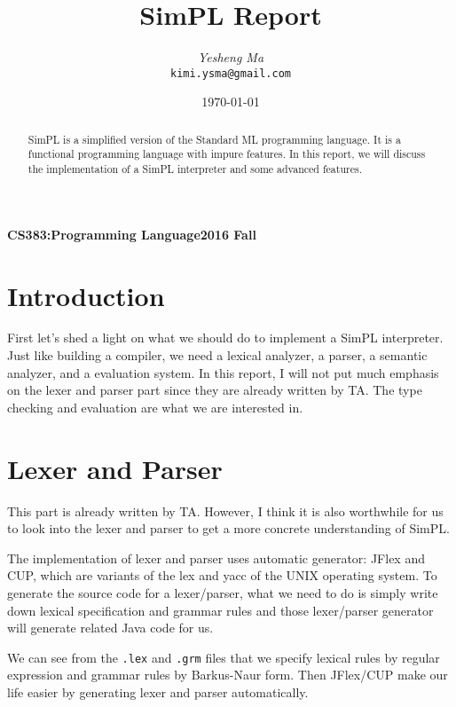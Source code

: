 \documentclass{article}
\begin{document}
\title{SimPL Report}
\author{\textit{Yesheng Ma}\\ {\small\tt kimi.ysma@gmail.com}}
\date{\today}

{\bf\small CS383:Programming Language\hfill{\bf\small 2016 Fall}}
{\let\newpage\relax\maketitle}
\maketitle

\begin{abstract}
SimPL is a simplified version of the Standard ML programming language. It is a functional programming language with impure features. In this report, we will discuss the implementation of a SimPL interpreter and some advanced features.
\end{abstract}


\section{Introduction}
First let's shed a light on what we should do to implement a SimPL interpreter. Just like building a compiler, we need a lexical analyzer, a parser, a semantic analyzer, and a evaluation system. In this report, I will not put much emphasis on the lexer and parser part since they are already written by TA. The type checking and evaluation are what we are interested in.  


\section{Lexer and Parser}
This part is already written by TA. However, I think it is also worthwhile for us to look into the lexer and parser to get a more concrete understanding of SimPL.

The implementation of lexer and parser uses automatic generator: JFlex and CUP, which are variants of the lex and yacc of the UNIX operating system. To generate the source code for a lexer/parser, what we need to do is simply write down lexical specification and grammar rules and those lexer/parser generator will generate related Java code for us.

We can see from the \texttt{.lex} and \texttt{.grm} files that we specify lexical rules by regular expression and grammar rules by Barkus-Naur form. Then JFlex/CUP make our life easier by generating lexer and parser automatically.
\end{document}
